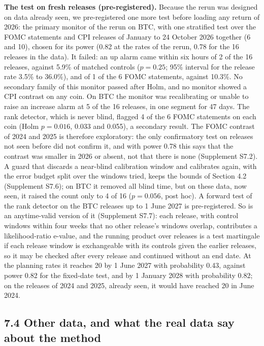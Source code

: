 \documentclass[
]{article}
\begin{document}
\textbf{The test on fresh releases (pre-registered).} Because the rerun
was designed on data already seen, we pre-registered one more test
before loading any return of 2026: the primary monitor of the rerun on
BTC, with one stratified test over the FOMC statements and CPI releases
of January to 24 October 2026 together (6 and 10), chosen for its power
(0.82 at the rates of the rerun, 0.78 for the 16 releases in the data).
It failed: an up alarm came within six hours of 2 of the 16 releases,
against 5.9\% of matched controls (\(p = 0.25\); 95\% interval for the
release rate 3.5\% to 36.0\%), and of 1 of the 6 FOMC statements,
against 10.3\%. No secondary family of this monitor passed after Holm,
and no monitor showed a CPI contrast on any coin. On BTC the monitor was
recalibrating or unable to raise an increase alarm at 5 of the 16
releases, in one segment for 47 days. The rank detector, which is never
blind, flagged 4 of the 6 FOMC statements on each coin (Holm
\(p = 0.016\), 0.033 and 0.055), a secondary result. The FOMC contrast
of 2024 and 2025 is therefore exploratory: the only confirmatory test on
releases not seen before did not confirm it, and with power 0.78 this
says that the contrast was smaller in 2026 or absent, not that there is
none (Supplement S7.2). A guard that discards a near-blind calibration
window and calibrates again, with the error budget split over the
windows tried, keeps the bounds of Section 4.2 (Supplement S7.6); on BTC
it removed all blind time, but on these data, now seen, it raised the
count only to 4 of 16 (\(p = 0.056\), post hoc). A forward test of the
rank detector on the BTC releases up to 1 June 2027 is pre-registered.
So is an anytime-valid version of it (Supplement S7.7): each release,
with control windows within four weeks that no other release's windows
overlap, contributes a likelihood-ratio e-value, and the running product
over releases is a test martingale if each release window is
exchangeable with its controls given the earlier releases, so it may be
checked after every release and continued without an end date. At the
planning rates it reaches 20 by 1 June 2027 with probability 0.43,
against power 0.82 for the fixed-date test, and by 1 January 2028 with
probability 0.82; on the releases of 2024 and 2025, already seen, it
would have reached 20 in June 2024.

\hypertarget{other-data-and-what-the-real-data-say-about-the-method}{%
\subsection{7.4 Other data, and what the real data say about the
method}\label{other-data-and-what-the-real-data-say-about-the-method}}
\end{document}

